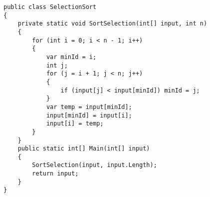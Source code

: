 \vspace{\baselineskip}
\begin{tcolorbox}
\begin{verbatim} 
public class SelectionSort
{
    private static void SortSelection(int[] input, int n)
    {
        for (int i = 0; i < n - 1; i++)
        {
            var minId = i;
            int j;
            for (j = i + 1; j < n; j++)
            {
                if (input[j] < input[minId]) minId = j;
            }
            var temp = input[minId];
            input[minId] = input[i];
            input[i] = temp;
        }
    }
    public static int[] Main(int[] input)
    {
        SortSelection(input, input.Length);
        return input;
    }
}
\end{verbatim}
\end{tcolorbox}